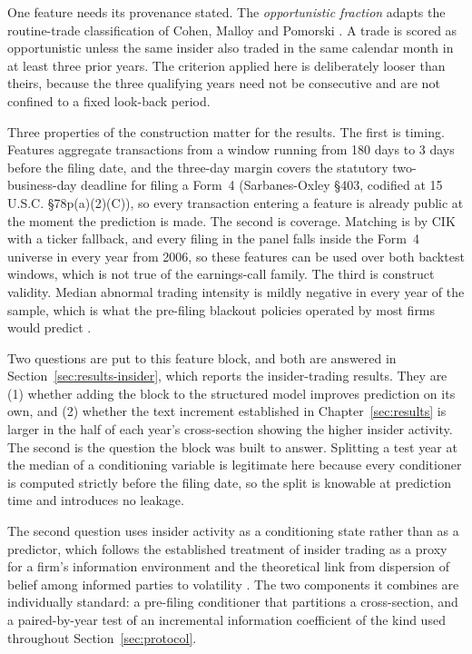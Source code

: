 \documentclass[logo,msc,ai]{infthesis}        %
\begin{document}
One feature needs its provenance stated. The \emph{opportunistic fraction} adapts the routine-trade classification of Cohen, Malloy and Pomorski \cite{cohen2012decoding}. A trade is scored as opportunistic unless the same insider also traded in the same calendar month in at least three prior years. The criterion applied here is deliberately looser than theirs, because the three qualifying years need not be consecutive and are not confined to a fixed look-back period.

Three properties of the construction matter for the results. The first is timing. Features aggregate transactions from a window running from 180 days to 3 days before the filing date, and the three-day margin covers the statutory two-business-day deadline for filing a Form~4 (Sarbanes-Oxley \S403, codified at 15 U.S.C. \S78p(a)(2)(C)), so every transaction entering a feature is already public at the moment the prediction is made. The second is coverage. Matching is by CIK with a ticker fallback, and every filing in the panel falls inside the Form~4 universe in every year from 2006, so these features can be used over both backtest windows, which is not true of the earnings-call family. The third is construct validity. Median abnormal trading intensity is mildly negative in every year of the sample, which is what the pre-filing blackout policies operated by most firms would predict \cite{bettis2000corporate}.

Two questions are put to this feature block, and both are answered in Section~\ref{sec:results-insider}, which reports the insider-trading results. They are (1) whether adding the block to the structured model improves prediction on its own, and (2) whether the text increment established in Chapter~\ref{sec:results} is larger in the half of each year's cross-section showing the higher insider activity. The second is the question the block was built to answer. Splitting a test year at the median of a conditioning variable is legitimate here because every conditioner is computed strictly before the filing date, so the split is knowable at prediction time and introduces no leakage.

The second question uses insider activity as a conditioning state rather than as a predictor, which follows the established treatment of insider trading as a proxy for a firm's information environment \cite{frankel2004characteristics} and the theoretical link from dispersion of belief among informed parties to volatility \cite{shalen1993volume}. The two components it combines are individually standard: a pre-filing conditioner that partitions a cross-section, and a paired-by-year test of an incremental information coefficient of the kind used throughout Section~\ref{sec:protocol}.
\end{document}
